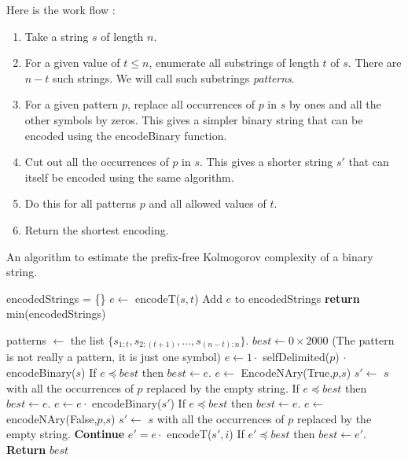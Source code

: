 \documentclass[12pt]{amsart}
\theoremstyle{definition}
\theoremstyle{remark}
\theoremstyle{definition}
\theoremstyle{remark}
\begin{document}
			Here is the work flow :
			\begin{enumerate}
				\item Take a string $s$ of length $n$.
				\item For a given value of $t \leq n$, enumerate all substrings of length $t$ of $s$. There are $n-t$ such strings. We will call such substrings
					\emph{patterns}.
				\item For a given pattern $p$, replace all occurrences of $p$ in $s$ by ones and all the other symbols by zeros. This gives a simpler binary string that can be encoded using the encodeBinary function. 
				\item Cut out all the occurrences of $p$ in $s$. This gives a shorter string $s'$ that can itself be encoded using the same algorithm.
				\item Do this for all patterns $p$ and all allowed values of $t$.
				\item Return the shortest encoding.
			\end{enumerate}

		\begin{algorithm}
			\caption{An algorithm to estimate the prefix-free Kolmogorov complexity of a binary string.}
			\label{algo}
			\begin{algorithmic}
					\State encodedStrings = \{\} 
						\State $e \gets$ encodeT($s,t$) 
						\State Add $e$ to encodedStrings
					\EndFor
					\State \textbf{return} min(encodedStrings) 
				\EndProcedure

				\State patterns $\gets$ the list $\{s_{1:t}, s_{2:(t+1)}, \dots , s_{(n-t):n} \}$.
				\State $best \gets 0 \times 2000$ 
				 
					 \Comment(The pattern is not really a pattern, it is just one symbol)
						\State $e \gets 1 \cdot $ selfDelimited($p$) $ \cdot $ encodeBinary($s$)
						\State If $e \preceq best$ then $best \gets e$. 
						\Else {}
							\State $e \gets $ EncodeNAry(True,$p$,$s$)
							\State $s' \gets $ $s$ with all the occurrences of $p$ replaced by the empty string.
								\State If $e \preceq best$ then $best \gets e$. 
							\Else
								\State $e \gets e \cdot $ encodeBinary($s'$)
								\State If $e \preceq best$ then $best \gets e$. 
							\EndIf
					\EndIf
				\EndFor
					\State $e \gets $ encodeNAry(False,$p$,$s$)
					\State $s' \gets $ $s$ with all the occurrences of $p$ replaced by the empty string.
					\State \textbf{Continue}
					\Else
						\State $e' = e \cdot $ encodeT($s',i$)
						\State If $e' \preceq best$ then $best \gets e'$. 
					\EndFor
					\EndIf
				\EndFor
				\textbf{Return} $best$
				\EndFunction
			\end{algorithmic}
		\end{algorithm}

	
	
\end{document}
